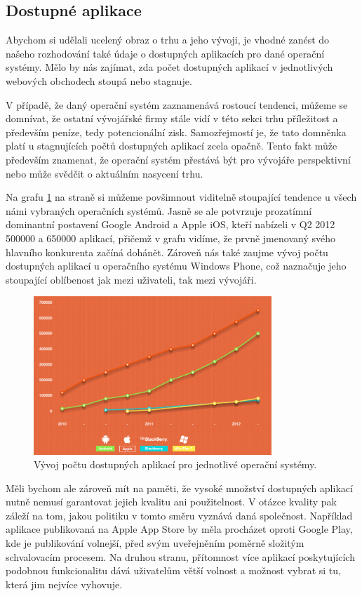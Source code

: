 \documentclass[thesis=M,czech]{FITthesis}[2012/06/26]
\begin{document}
\subsection{Dostupné aplikace}
Abychom si udělali ucelený obraz o trhu a jeho vývoji, je vhodné zanést do našeho rozhodování také údaje o dostupných aplikacích pro dané operační systémy. Mělo by nás zajímat, zda počet dostupných aplikací v jednotlivých webových obchodech stoupá nebo stagnuje.

V případě, že daný operační systém zaznamenává rostoucí tendenci, můžeme se domnívat, že ostatní vývojářské firmy stále vidí v této sekci trhu příležitost a především peníze, tedy potencionální zisk. Samozřejmostí je, že tato domněnka platí u stagnujících počtů dostupných aplikací zcela opačně. Tento fakt může především znamenat, že operační systém přestává být pro vývojáře perspektivní nebo může svědčit o aktuálním nasycení trhu.

Na grafu \ref{fig:apps} na straně \pageref{fig:apps} si můžeme povšimnout viditelně stoupající tendence u všech námi vybraných operačních systémů. Jasně se ale potvrzuje prozatímní dominantní postavení Google Android a Apple iOS, kteří nabízeli v Q2 2012 500000 a 650000 aplikací, přičemž v grafu vidíme, že prvně jmenovaný svého hlavního konkurenta začíná dohánět. Zároveň nás také zaujme vývoj počtu dostupných aplikací u operačního systému Windows Phone, což naznačuje jeho stoupající oblíbenost jak mezi uživateli, tak mezi vývojáři.

\begin{figure}\centering
	\includegraphics[width=0.8\textwidth]{figures/apps_available}
	\caption{Vývoj počtu dostupných aplikací pro jednotlivé operační systémy.\cite{mobile_stats}}
	\label{fig:apps}
\end{figure}

Měli bychom ale zároveň mít na paměti, že vysoké množství dostupných aplikací nutně nemusí garantovat jejich kvalitu ani použitelnost. V otázce kvality pak záleží na tom, jakou politiku v tomto směru vyznává daná společnost. Například aplikace publikovaná na Apple App Store by měla procházet oproti Google Play, kde je publikování volnejší, před svým uveřejněním poměrně složitým schvalovacím procesem. Na druhou stranu, přítomnost více aplikací poskytujících podobnou funkcionalitu dává uživatelům větší volnost a možnost vybrat si tu, která jim nejvíce vyhovuje.
\end{document}

